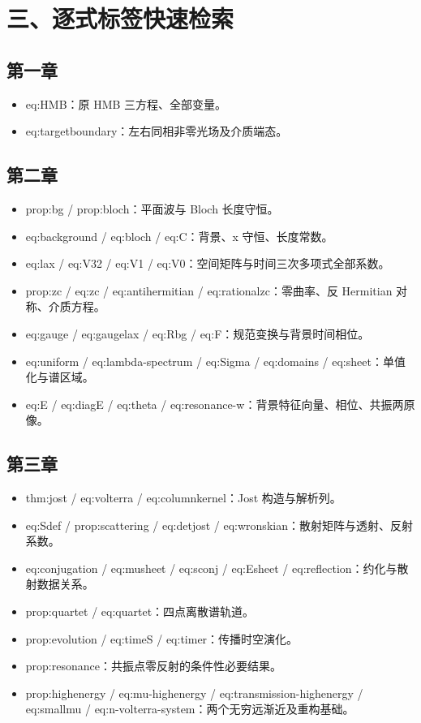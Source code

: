 \section{三、逐式标签快速检索}

\subsection{第一章}

\begin{itemize}[leftmargin=2em]
\item eq:HMB：原 HMB 三方程、全部变量。
\item eq:targetboundary：左右同相非零光场及介质端态。
\end{itemize}

\subsection{第二章}

\begin{itemize}[leftmargin=2em]
\item prop:bg / prop:bloch：平面波与 Bloch 长度守恒。
\item eq:background / eq:bloch / eq:C：背景、x 守恒、长度常数。
\item eq:lax / eq:V32 / eq:V1 / eq:V0：空间矩阵与时间三次多项式全部系数。
\item prop:zc / eq:zc / eq:antihermitian / eq:rationalzc：零曲率、反 Hermitian 对称、介质方程。
\item eq:gauge / eq:gaugelax / eq:Rbg / eq:F：规范变换与背景时间相位。
\item eq:uniform / eq:lambda-spectrum / eq:Sigma / eq:domains / eq:sheet：单值化与谱区域。
\item eq:E / eq:diagE / eq:theta / eq:resonance-w：背景特征向量、相位、共振两原像。
\end{itemize}

\subsection{第三章}

\begin{itemize}[leftmargin=2em]
\item thm:jost / eq:volterra / eq:columnkernel：Jost 构造与解析列。
\item eq:Sdef / prop:scattering / eq:detjost / eq:wronskian：散射矩阵与透射、反射系数。
\item eq:conjugation / eq:musheet / eq:sconj / eq:Esheet / eq:reflection：约化与散射数据关系。
\item prop:quartet / eq:quartet：四点离散谱轨道。
\item prop:evolution / eq:timeS / eq:timer：传播时空演化。
\item prop:resonance：共振点零反射的条件性必要结果。
\item prop:highenergy / eq:mu-highenergy / eq:transmission-highenergy / eq:smallmu / eq:n-volterra-system：两个无穷远渐近及重构基础。
\end{itemize}

